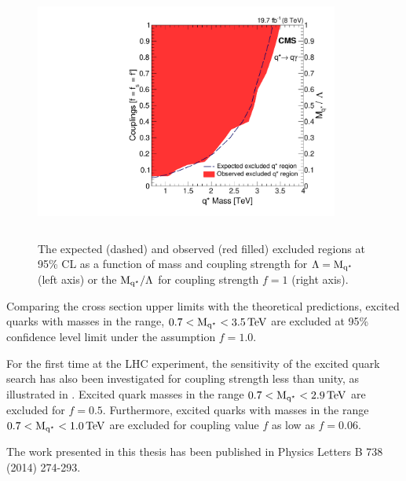 \begin{figure}[h!]
\centering
 \includegraphics[width=10cm,height=8.5cm]{ch6/plots/CouplingvsMass_paper_FR.pdf}
 \caption{ The expected (dashed) and observed (red filled) excluded regions at 95\% CL as a function of \qstar mass and coupling strength
for $\Lambda=\mathrm{M_{q^\star}}$ (left axis) or the $\mathrm{M_{q^\star}}/\Lambda$ for coupling strength $f=1$ (right axis).}
 \label{fig:LimitMassCoupling}
\end{figure}
Comparing the cross section upper limits with the theoretical predictions, excited quarks with masses in the range, $0.7<\mathrm{M_{q^\star}}<3.5\mathrm{\,TeV}$
are excluded at 95\% confidence level limit under the assumption $f=1.0$. 

For the first time at the LHC experiment, the sensitivity of the excited quark search has also been investigated for coupling strength less than 
unity, as illustrated in \fig{\ref{fig:LimitMassCoupling}}. Excited quark masses in the range $0.7<\mathrm{M_{q^\star}}<2.9\mathrm{\,TeV}$ are excluded for
$f=0.5$. Furthermore, excited quarks with masses in the range $0.7<\mathrm{M_{q^\star}}<1.0\mathrm{\,TeV}$ are excluded for coupling value $f$ as low as $f=0.06$.

The work presented in this thesis has been published in Physics Letters B 738 (2014) 274-293.

